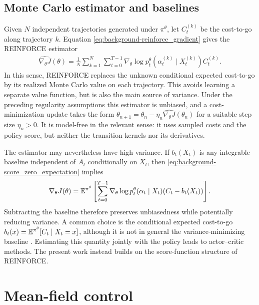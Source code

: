 \subsection{Monte Carlo estimator and baselines}

Given $N$ independent trajectories generated under $\pi^\theta$, let
$C_t^{(k)}$ be the cost-to-go along trajectory $k$. Equation \eqref{eq:background-reinforce_gradient} gives the REINFORCE estimator
\begin{align}
    \label{eq:background-reinforce_estimator}
    \widehat{\nabla_\theta J}(\theta) = \frac1N \sum_{k=1}^N \sum_{t=0}^{T-1} \nabla_\theta\log p_t^\theta(\alpha_t^{(k)}\mid X_t^{(k)}) C_t^{(k)}.
\end{align}
In this sense, REINFORCE replaces the unknown conditional expected cost-to-go by its realized Monte Carlo value on each trajectory. This avoids learning a separate value function, but is also the main source of variance. Under the preceding regularity assumptions this estimator is unbiased, and a cost-minimization update takes the form $\theta_{n+1} = \theta_n - \eta_n \widehat{\nabla_\theta J}(\theta_n)$ for a suitable step size $\eta_n > 0$. It is model-free in the relevant sense: it uses sampled costs and the policy score, but neither the transition kernels nor its derivatives.

The estimator may nevertheless have high variance. If $b_t(X_t)$ is any integrable baseline independent of $A_t$ conditionally on $X_t$, then \eqref{eq:background-score_zero_expectation} implies
\begin{align}
    \label{eq:background-reinforce_baseline}
    \nabla_\theta J(\theta) = \mathbb{E}^{\pi^\theta} \left[\sum_{t=0}^{T-1} \nabla_\theta\log p_t^\theta(\alpha_t\mid X_t) (C_t - b_t(X_t)) \right].
\end{align}
Subtracting the baseline therefore preserves unbiasedness while potentially reducing variance. A common choice is the conditional expected cost-to-go $b_t(x)=\mathbb{E}^{\pi^\theta}[C_t\mid X_t=x]$, although it is not in general the variance-minimizing baseline \cite{greensmith2004variance}. Estimating this quantity jointly with the policy leads to actor--critic methods. The present work instead builds on the score-function structure of REINFORCE.


\section{Mean-field control}
\label{sec:background-mfc}

